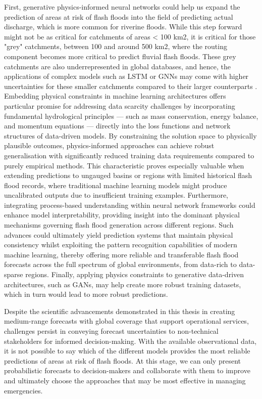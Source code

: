 First, generative physics-informed neural networks could help us expand the prediction of areas at risk of flash floods into the field of predicting actual discharge, which is more common for riverine floods. While this step forward might not be as critical for catchments of areas < 100 km2, it is critical for those "grey" catchments, between 100 and around 500 km2, where the routing component becomes more critical to predict fluvial flash floods. These grey catchments are also underrepresented in global databases, and hence, the applications of complex models such as LSTM or GNNs may come with higher uncertainties for these smaller catchments compared to their larger counterparts \citep{Nearing_2024}. Embedding physical constraints in machine learning architectures offers particular promise for addressing data scarcity challenges by incorporating fundamental hydrological principles — such as mass conservation, energy balance, and momentum equations — directly into the loss functions and network structures of data-driven models. By constraining the solution space to physically plausible outcomes, physics-informed approaches can achieve robust generalisation with significantly reduced training data requirements compared to purely empirical methods. This characteristic proves especially valuable when extending predictions to ungauged basins or regions with limited historical flash flood records, where traditional machine learning models might produce uncalibrated outputs due to insufficient training examples. Furthermore, integrating process-based understanding within neural network frameworks could enhance model interpretability, providing insight into the dominant physical mechanisms governing flash flood generation across different regions. Such advances could ultimately yield prediction systems that maintain physical consistency whilst exploiting the pattern recognition capabilities of modern machine learning, thereby offering more reliable and transferable flash flood forecasts across the full spectrum of global environments, from data-rich to data-sparse regions. Finally, applying physics constraints to generative data-driven architectures, such as GANs, may help create more robust training datasets, which in turn would lead to more robust predictions. 

Despite the scientific advancements demonstrated in this thesis in creating medium-range forecasts with global coverage that support operational services, challenges persist in conveying forecast uncertainties to non-technical stakeholders for informed decision-making. With the available observational data, it is not possible to say which of the different models provides the most reliable predictions of areas at risk of flash floods. At this stage, we can only present probabilistic forecasts to decision-makers and collaborate with them to improve and ultimately choose the approaches that may be most effective in managing emergencies. 


